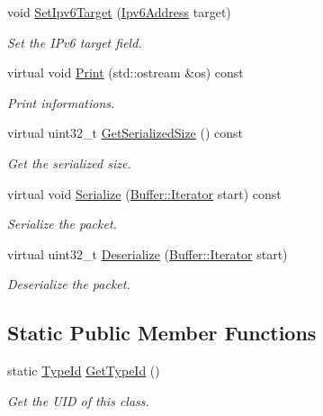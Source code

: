 \begin{DoxyCompactItemize}
void \hyperlink{classns3_1_1Icmpv6NS_a188a8d96be3c92fca896e15bb54b1b63}{Set\+Ipv6\+Target} (\hyperlink{classns3_1_1Ipv6Address}{Ipv6\+Address} target)
\begin{DoxyCompactList}\small\item\em Set the I\+Pv6 target field. \end{DoxyCompactList}\item 
virtual void \hyperlink{classns3_1_1Icmpv6NS_a7d4425ab5073d0a8a769db37d7b00e21}{Print} (std\+::ostream \&os) const 
\begin{DoxyCompactList}\small\item\em Print informations. \end{DoxyCompactList}\item 
virtual uint32\+\_\+t \hyperlink{classns3_1_1Icmpv6NS_afc5f70ae9881752c1108253ac26293b6}{Get\+Serialized\+Size} () const 
\begin{DoxyCompactList}\small\item\em Get the serialized size. \end{DoxyCompactList}\item 
virtual void \hyperlink{classns3_1_1Icmpv6NS_ad32a9d574a29228cddfc6e70aea129b7}{Serialize} (\hyperlink{classns3_1_1Buffer_1_1Iterator}{Buffer\+::\+Iterator} start) const 
\begin{DoxyCompactList}\small\item\em Serialize the packet. \end{DoxyCompactList}\item 
virtual uint32\+\_\+t \hyperlink{classns3_1_1Icmpv6NS_aa2fa4464ead95a030997d55f1f023dc0}{Deserialize} (\hyperlink{classns3_1_1Buffer_1_1Iterator}{Buffer\+::\+Iterator} start)
\begin{DoxyCompactList}\small\item\em Deserialize the packet. \end{DoxyCompactList}\end{DoxyCompactItemize}
\subsection*{Static Public Member Functions}
\begin{DoxyCompactItemize}
\item 
static \hyperlink{classns3_1_1TypeId}{Type\+Id} \hyperlink{classns3_1_1Icmpv6NS_a4b5ef8c954c59b44b421d42a63ba675b}{Get\+Type\+Id} ()
\begin{DoxyCompactList}\small\item\em Get the U\+ID of this class. \end{DoxyCompactList}\end{DoxyCompactItemize}

